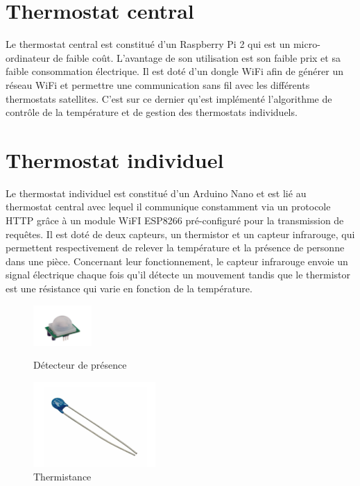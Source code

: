\documentclass[12pt]{report}
\begin{document}
\section{Thermostat central}
Le thermostat central est constitué d'un Raspberry Pi 2 qui est un micro-ordinateur de faible coût. L'avantage de son utilisation est son faible prix et sa faible consommation électrique. Il est doté d'un dongle WiFi afin de générer un réseau WiFi et permettre une communication sans fil avec les différents thermostats satellites. C'est sur ce dernier qu'est implémenté l'algorithme de contrôle de la température et de gestion des thermostats individuels.

\section{Thermostat individuel}
Le thermostat individuel est constitué d'un Arduino Nano et est lié au thermostat central avec lequel il communique constamment via un protocole HTTP grâce à un module WiFI ESP8266 pré-configuré pour la transmission de requêtes.
Il est doté de deux capteurs, un thermistor et un capteur infrarouge, qui permettent respectivement de relever la température et la présence de personne dans une pièce.
Concernant leur fonctionnement, le capteur infrarouge envoie un signal électrique chaque fois qu'il détecte un mouvement tandis que le thermistor est une résistance qui varie en fonction de la température. \\

\begin{figure}[H]
    \begin{minipage}[t]{8cm}
    	\centering
        \includegraphics[scale=1.4]{detecteur_presence.png}
        \caption{\label{detecteur_presence.png} Détecteur de pr\'{e}sence}
    \end{minipage}\hfill
    \begin{minipage}[t]{8cm}
    	\centering
        \includegraphics{thermistance.png}
        \caption{\label{thermistance} Thermistance}
    \end{minipage}
\end{figure}
\vspace{1cm}
\end{document}
